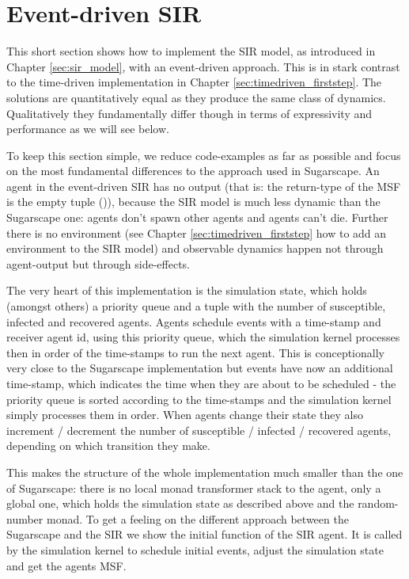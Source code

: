 \section{Event-driven SIR}
\label{sec:eventdriven_sir}
This short section shows how to implement the SIR model, as introduced in Chapter \ref{sec:sir_model}, with an event-driven approach. This is in stark contrast to the time-driven implementation in Chapter \ref{sec:timedriven_firststep}. The solutions are quantitatively equal as they produce the same class of dynamics. Qualitatively they fundamentally differ though in terms of expressivity and performance as we will see below.

To keep this section simple, we reduce code-examples as far as possible and focus on the most fundamental differences to the approach used in Sugarscape. An agent in the event-driven SIR has no output (that is: the return-type of the MSF is the empty tuple ()), because the SIR model is much less dynamic than the Sugarscape one: agents don't spawn other agents and agents can't die. Further there is no environment (see Chapter \ref{sec:timedriven_firststep} how to add an environment to the SIR model) and observable dynamics happen not through agent-output but through side-effects.

The very heart of this implementation is the simulation state, which holds (amongst others) a priority queue and a tuple with the number of susceptible, infected and recovered agents. Agents schedule events with a time-stamp and receiver agent id, using this priority queue, which the simulation kernel processes then in order of the time-stamps to run the next agent. This is conceptionally very close to the Sugarscape implementation but events have now an additional time-stamp, which indicates the time when they are about to be scheduled - the priority queue is sorted according to the time-stamps and the simulation kernel simply processes them in order. When agents change their state they also increment / decrement the number of susceptible / infected / recovered agents, depending on which transition they make.

This makes the structure of the whole implementation much smaller than the one of Sugarscape: there is no local monad transformer stack to the agent, only a global one, which holds the simulation state as described above and the random-number monad. To get a feeling on the different approach between the Sugarscape and the SIR we show the initial function of the SIR agent. It is called by the simulation kernel to schedule initial events, adjust the simulation state and get the agents MSF.

